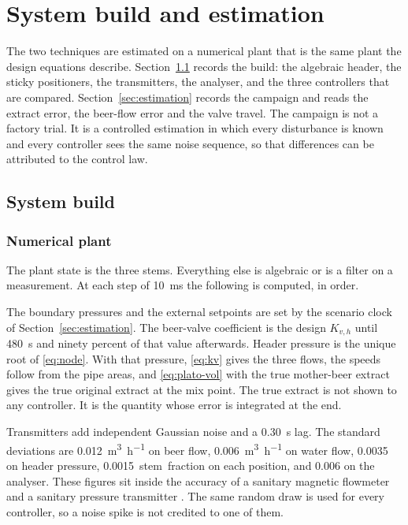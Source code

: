 \chapter{System build and estimation}
\label{ch:estimate}

The two techniques are estimated on a numerical plant that is the same plant the design equations describe. Section~\ref{sec:build} records the build: the algebraic header, the sticky positioners, the transmitters, the analyser, and the three controllers that are compared. Section~\ref{sec:estimation} records the campaign and reads the extract error, the beer-flow error and the valve travel. The campaign is not a factory trial. It is a controlled estimation in which every disturbance is known and every controller sees the same noise sequence, so that differences can be attributed to the control law.

\section{System build}
\label{sec:build}

\subsection{Numerical plant}

The plant state is the three stems. Everything else is algebraic or is a filter on a measurement. At each step of \SI{10}{ms} the following is computed, in order.

The boundary pressures and the external setpoints are set by the scenario clock of Section~\ref{sec:estimation}. The beer-valve coefficient is the design $K_{v,h}$ until \SI{480}{s} and ninety percent of that value afterwards. Header pressure is the unique root of \eqref{eq:node}. With that pressure, \eqref{eq:kv} gives the three flows, the speeds follow from the pipe areas, and \eqref{eq:plato-vol} with the true mother-beer extract gives the true original extract at the mix point. The true extract is not shown to any controller. It is the quantity whose error is integrated at the end.

Transmitters add independent Gaussian noise and a \SI{0.30}{s} lag. The standard deviations are \SI{0.012}{\cubic\metre\per\hour} on beer flow, \SI{0.006}{\cubic\metre\per\hour} on water flow, \SI{0.0035}{\barg} on header pressure, \SI{0.0015}{stem fraction} on each position, and \SI{0.006}{\plato} on the analyser. These figures sit inside the accuracy of a sanitary magnetic flowmeter and a sanitary pressure transmitter \cite{baker2016flow,liptak2006handbook}. The same random draw is used for every controller, so a noise spike is not credited to one of them.

